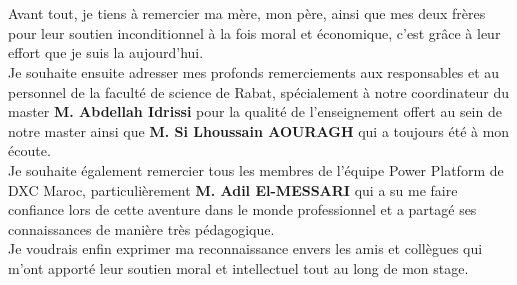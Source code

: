 \titleformat{\chapter}[display]
{\normalfont\huge\bfseries}{\filcenter\underline{\MakeUppercase{{\chaptertitlename}}\ \thechapter}}{20pt}{\Huge}

\titlespacing*{\chapter}{0pt}{1.80in}{0in}
\chapter*{}
\titlespacing*{\chapter}{0pt}{0.45in}{0.3in}%
\vspace{1in}


Avant tout, je tiens à remercier ma mère, mon père, ainsi que mes deux frères pour leur soutien inconditionnel à la fois moral et économique, c’est  grâce à leur effort que je suis la aujourd’hui. \\

Je souhaite ensuite adresser mes profonds remerciements aux responsables et au personnel de la faculté de science de Rabat, spécialement à notre coordinateur du master \textbf{M. Abdellah Idrissi} pour la qualité de l’enseignement offert au sein de notre master ainsi que \textbf{M. Si Lhoussain AOURAGH } qui a toujours été à mon écoute. 
\\

Je souhaite également remercier tous les membres de l’équipe Power Platform de DXC Maroc, particulièrement \textbf{M. Adil El-MESSARI} qui a su me faire confiance lors de cette aventure dans le monde professionnel et a partagé ses connaissances de manière très pédagogique.\\ %

Je voudrais enfin exprimer ma reconnaissance envers les amis et collègues qui m’ont apporté leur soutien moral et intellectuel tout au long de mon stage.



